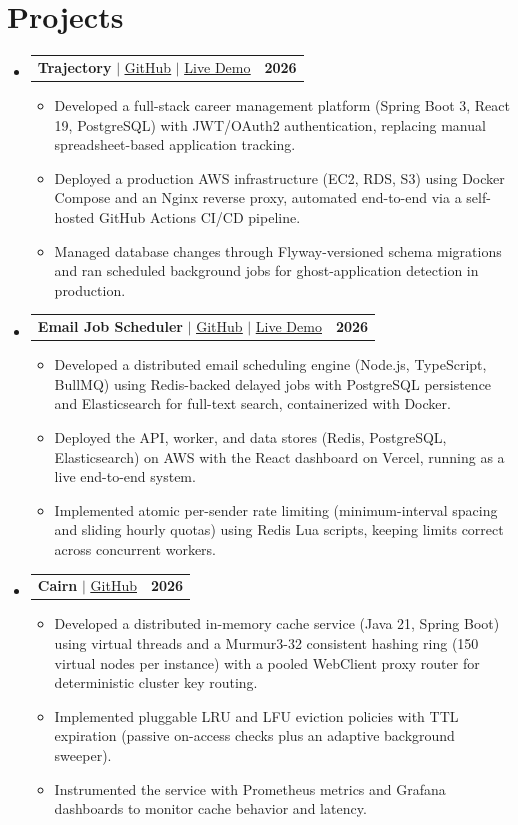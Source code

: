 \documentclass[letterpaper,10pt]{article}
\makeatletter
\newcommand{\resumeItem}[1]{
  \item\small{
    {#1 \vspace{-2pt}}
  }
}
\newcommand{\resumeProjectHeading}[2]{
    \item
    \begin{tabular*}{1.001\textwidth}{l@{\extracolsep{\fill}}r}
      \small#1 & \textbf{\small #2}\\
    \end{tabular*}\vspace{-7pt}
}
\newcommand{\resumeSubHeadingListStart}{\begin{itemize}[leftmargin=0.0in, label={}]}
\newcommand{\resumeSubHeadingListEnd}{\end{itemize}}
\newcommand{\resumeItemListStart}{\begin{itemize}}
\newcommand{\resumeItemListEnd}{\end{itemize}\vspace{-5pt}}
\makeatother
\begin{document}
\section{Projects}
    \vspace{-5pt}
    \resumeSubHeadingListStart
\resumeProjectHeading
    {\textbf{Trajectory} $|$ \href{https://github.com/vaibhv19/trajectory}{\underline{GitHub}} $|$ \href{https://trajectory.vaibhv19.dev}{\underline{Live Demo}}}{2026}
    \resumeItemListStart
        \resumeItem{Developed a full-stack career management platform (Spring Boot 3, React 19, PostgreSQL) with JWT/OAuth2 authentication, replacing manual spreadsheet-based application tracking.}
        \resumeItem{Deployed a production AWS infrastructure (EC2, RDS, S3) using Docker Compose and an Nginx reverse proxy, automated end-to-end via a self-hosted GitHub Actions CI/CD pipeline.}
        \resumeItem{Managed database changes through Flyway-versioned schema migrations and ran scheduled background jobs for ghost-application detection in production.}
    \resumeItemListEnd
          \vspace{-13pt}
\resumeProjectHeading
    {\textbf{Email Job Scheduler} $|$ \href{https://github.com/vaibhv19/Email-Job-Scheduler}{\underline{GitHub}} $|$ \href{https://email-job-scheduler.vaibhv19.dev}{\underline{Live Demo}}}{2026}
    \resumeItemListStart
        \resumeItem{Developed a distributed email scheduling engine (Node.js, TypeScript, BullMQ) using Redis-backed delayed jobs with PostgreSQL persistence and Elasticsearch for full-text search, containerized with Docker.}
        \resumeItem{Deployed the API, worker, and data stores (Redis, PostgreSQL, Elasticsearch) on AWS with the React dashboard on Vercel, running as a live end-to-end system.}
        \resumeItem{Implemented atomic per-sender rate limiting (minimum-interval spacing and sliding hourly quotas) using Redis Lua scripts, keeping limits correct across concurrent workers.}
    \resumeItemListEnd
          \vspace{-13pt}
\resumeProjectHeading
    {\textbf{Cairn} $|$ \href{https://github.com/vaibhv19/Cairn}{\underline{GitHub}}}{2026}
    \resumeItemListStart
        \resumeItem{Developed a distributed in-memory cache service (Java 21, Spring Boot) using virtual threads and a Murmur3-32 consistent hashing ring (150 virtual nodes per instance) with a pooled WebClient proxy router for deterministic cluster key routing.}
        \resumeItem{Implemented pluggable LRU and LFU eviction policies with TTL expiration (passive on-access checks plus an adaptive background sweeper).}
        \resumeItem{Instrumented the service with Prometheus metrics and Grafana dashboards to monitor cache behavior and latency.}
    \resumeItemListEnd
    \resumeSubHeadingListEnd
\vspace{-12pt}
\end{document}
